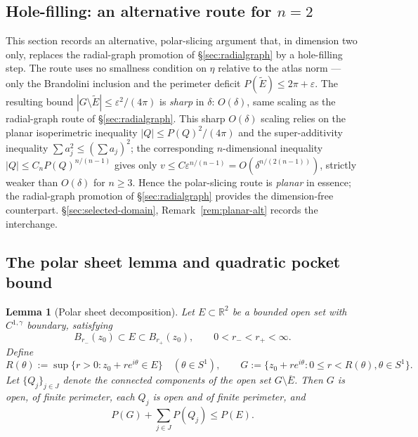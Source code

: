 \documentclass[11pt]{amsart}
\newtheorem{lemma}[theorem]{Lemma}
\newcommand{\R}{\mathbb R}
\newcommand{\eps}{\varepsilon}
\newcommand{\Etil}{\widetilde E}
\begin{document}
\subsection{Hole-filling: an alternative route for $n=2$}
\label{sec:hole-fill}

This section records an alternative, polar-slicing argument that, in
dimension two only, replaces the radial-graph promotion of
\S\ref{sec:radialgraph} by a hole-filling step.  The route uses no
smallness condition on \(\eta\) relative to the atlas norm — only the
Brandolini inclusion and the perimeter deficit
\(P(\Etil)\le 2\pi+\eps\).  The resulting bound
\(|G\setminus\Etil|\le\eps^{2}/(4\pi)\) is \emph{sharp} in
\(\delta\): \(O(\delta)\), same scaling as the radial-graph route
of \S\ref{sec:radialgraph}.  This sharp \(O(\delta)\) scaling
relies on the planar isoperimetric inequality
\(|Q|\le P(Q)^{2}/(4\pi)\) and the super-additivity inequality
\(\sum a_j^{2}\le(\sum a_j)^{2}\); the corresponding \(n\)-dimensional
inequality \(|Q|\le C_n P(Q)^{n/(n-1)}\) gives only
\(v\le C\eps^{n/(n-1)}=O(\delta^{n/(2(n-1))})\), strictly weaker than
\(O(\delta)\) for \(n\ge 3\).  Hence the polar-slicing route is
\emph{planar} in essence; the radial-graph promotion of
\S\ref{sec:radialgraph} provides the dimension-free counterpart.
\S\ref{sec:selected-domain}, Remark~\ref{rem:planar-alt} records the
interchange.

\subsection{The polar sheet lemma and quadratic pocket bound}

\begin{lemma}[Polar sheet decomposition]\label{lem:hull-decomp}
Let \(E\subset\R^2\) be a bounded open set with \(C^{1,\gamma}\) boundary,
satisfying
\begin{equation}\label{eq:core}
   B_{r_-}(z_0)\subset E\subset B_{r_+}(z_0),
   \qquad
   0<r_-<r_+<\infty.
\end{equation}
Define
\[
   R(\theta):=\sup\{r>0:z_0+r e^{i\theta}\in E\}\quad(\theta\in S^1),
   \qquad
   G:=\bigl\{z_0+re^{i\theta}:0\le r<R(\theta),\theta\in S^1\bigr\}.
\]
Let \(\{Q_j\}_{j\in J}\) denote the connected components of the open
set \(G\setminus\overline E\).  Then \(G\) is open, of finite perimeter,
each \(Q_j\) is open and of finite perimeter, and
\begin{equation}\label{eq:hull-decomp}
   P(G)+\sum_{j\in J}P(Q_j)\le P(E).
\end{equation}
\end{lemma}
\end{document}
